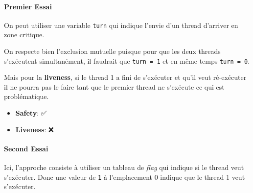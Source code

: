\paragraph{Premier Essai}\label{premier-essai}

On peut utiliser une variable \texttt{turn} qui indique l'envie d'un
thread d'arriver en zone critique.

\begin{Shaded}
\begin{Highlighting}[]
 \OperatorTok{(}\OperatorTok{!=}\OperatorTok{)} \OperatorTok{\{} 
\OperatorTok{\}} 
\OperatorTok{();}
\OperatorTok{=}\OperatorTok{;}

 \OperatorTok{(}\OperatorTok{!=}\OperatorTok{)} \OperatorTok{\{}
\OperatorTok{\}} 
\OperatorTok{();}
\OperatorTok{=}\OperatorTok{;}
\end{Highlighting}
\end{Shaded}

On respecte bien l'exclusion mutuelle puisque pour que les deux threads
s'exécutent simultanément, il faudrait que \texttt{turn\ =\ 1} et en
même temps \texttt{turn\ =\ 0}.

Mais pour la \textbf{liveness}, si le thread 1 a fini de s'exécuter et
qu'il veut ré-exécuter il ne pourra pas le faire tant que le premier
thread ne s'exécute ce qui est problématique.

\begin{itemize}
\tightlist
\item
  \textbf{Safety}: ✅
\item
  \textbf{Liveness}: ❌
\end{itemize}

\paragraph{Second Essai}\label{second-essai}

Ici, l'approche consiste à utiliser un tableau de \emph{flag} qui
indique si le thread veut s'exécuter. Donc une valeur de \texttt{1} à
l'emplacement 0 indique que le thread 1 veut s'exécuter.

